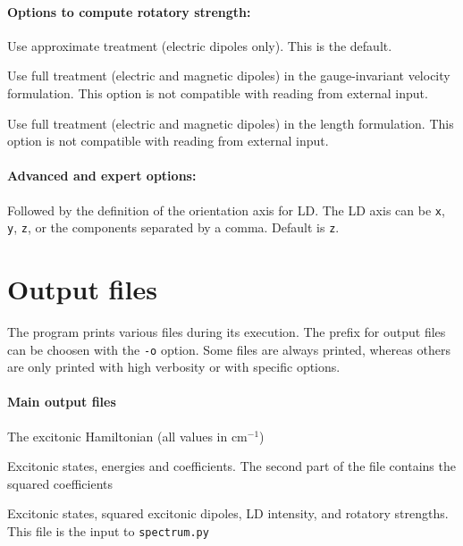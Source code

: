 \documentclass[a4paper,11pt]{article}
\begin{document}
\paragraph*{Options to compute rotatory strength:}
\begin{description}[labelsep=10pt, align=left, labelwidth=80pt,labelindent=0pt,leftmargin=90pt]
\item[\texttt{-{}-mu}]  Use approximate treatment (electric dipoles only). This is the default.
\item[\texttt{-{}-mag}] Use full treatment (electric and magnetic dipoles) in the gauge-invariant velocity formulation. This option is not compatible with reading from external input.
\item[\texttt{-{}-length}] Use full treatment (electric and magnetic dipoles) in the length formulation. This option is not compatible with reading from external input. 
\end{description}

\paragraph*{Advanced and expert options:}
\begin{description}[labelsep=10pt, align=left, labelwidth=80pt,labelindent=0pt,leftmargin=90pt]
\item[\texttt{-{}-ldaxis}] Followed by the definition of the orientation axis for LD. The LD axis can be \texttt{x}, \texttt{y}, \texttt{z}, or the components separated by a comma. Default is \texttt{z}.  
\end{description}

\section{Output files}

The program prints various files during its execution. The prefix for output files can be choosen with the \texttt{-o} option. Some files are always printed, whereas others are only printed with high verbosity or with specific options.

\paragraph*{Main output files}
\begin{description}[labelsep=10pt, align=left, labelwidth=85pt,labelindent=0pt,leftmargin=95pt]
\item[\texttt{matrix.dat}] The excitonic Hamiltonian (all values in cm$^{-1}$)
\item[\texttt{diag.dat}] Excitonic states, energies and coefficients. The second part of the file contains the squared coefficients
\item[\texttt{results.out}] Excitonic states, squared excitonic dipoles, LD intensity, and rotatory strengths. This file is the input to \texttt{spectrum.py}
\end{description}
\end{document}
